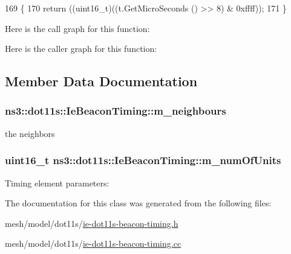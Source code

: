 \begin{DoxyCode}
169 \{
170   \textcolor{keywordflow}{return} ((uint16\_t)((t.GetMicroSeconds () >> 8) & 0xffff));
171 \}
\end{DoxyCode}


Here is the call graph for this function\+:




Here is the caller graph for this function\+:




\subsection{Member Data Documentation}
\subsubsection[{\texorpdfstring{m\+\_\+neighbours}{m_neighbours}}]{ ns3\+::dot11s\+::\+Ie\+Beacon\+Timing\+::m\+\_\+neighbours\hspace{0.3cm}{\ttfamily [private]}}\hypertarget{classns3_1_1dot11s_1_1IeBeaconTiming_acde5a981cb6e4d2afb319d6c879408b9}{}\label{classns3_1_1dot11s_1_1IeBeaconTiming_acde5a981cb6e4d2afb319d6c879408b9}


the neighbors 

\subsubsection[{\texorpdfstring{m\+\_\+num\+Of\+Units}{m_numOfUnits}}]{\setlength{\rightskip}{0pt plus 5cm}uint16\+\_\+t ns3\+::dot11s\+::\+Ie\+Beacon\+Timing\+::m\+\_\+num\+Of\+Units\hspace{0.3cm}{\ttfamily [private]}}\hypertarget{classns3_1_1dot11s_1_1IeBeaconTiming_a71584e499b5c7ff1679953f8e7c58cdc}{}\label{classns3_1_1dot11s_1_1IeBeaconTiming_a71584e499b5c7ff1679953f8e7c58cdc}
Timing element parameters\+: 

The documentation for this class was generated from the following files\+:\begin{DoxyCompactItemize}
\item 
mesh/model/dot11s/\hyperlink{ie-dot11s-beacon-timing_8h}{ie-\/dot11s-\/beacon-\/timing.\+h}\item 
mesh/model/dot11s/\hyperlink{ie-dot11s-beacon-timing_8cc}{ie-\/dot11s-\/beacon-\/timing.\+cc}\end{DoxyCompactItemize}
